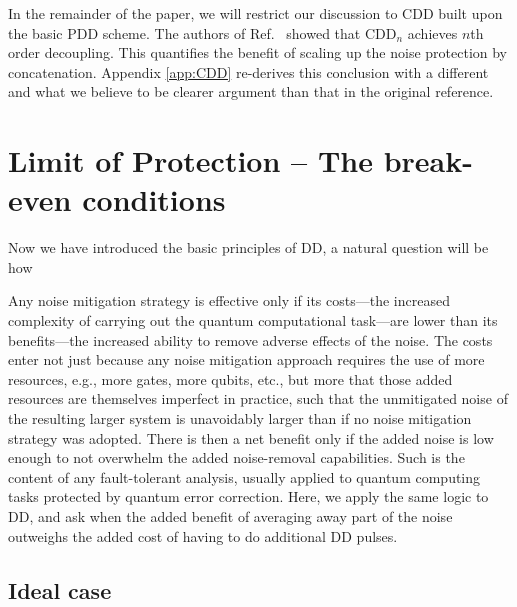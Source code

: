 \documentclass[pra,reprint,superscriptaddress]{revtex4-2}
\newcommand{\CDDn}{\mathrm{CDD}_n}
\begin{document}
In the remainder of the paper, we will restrict our discussion to CDD built upon the basic PDD scheme. The authors of Ref.~\cite{khodjasteh2005fault} showed that $\CDDn$ achieves $n$th order decoupling. This quantifies the benefit of scaling up the noise protection by concatenation. Appendix \ref{app:CDD} re-derives this conclusion with a different and what we believe to be clearer argument than that in the original reference. 





\newpage
\section{Limit of Protection -- The break-even conditions}
Now we have introduced the basic principles of DD, a natural question will be 
how 


Any noise mitigation strategy is effective only if its costs---the increased complexity of carrying out the quantum computational task---are lower than its benefits---the increased ability to remove adverse effects of the noise. The costs enter not just because any noise mitigation approach requires the use of more resources, e.g., more gates, more qubits, etc., but more that those added resources are themselves imperfect in practice, such that the unmitigated noise of the resulting larger system is unavoidably larger than if no noise mitigation strategy was adopted. There is then a net benefit only if the added noise is low enough to not overwhelm the added noise-removal capabilities. Such is the content of any fault-tolerant analysis, usually applied to quantum computing tasks protected by quantum error correction. Here, we apply the same logic to DD, and ask when the added benefit of averaging away part of the noise outweighs the added cost of having to do additional DD pulses.




\subsection{Ideal case}
\end{document}
